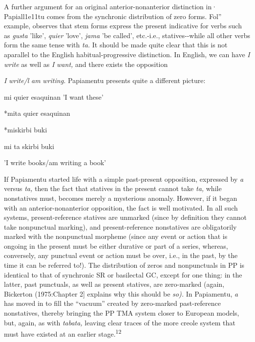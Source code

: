 A further argument for an original anterior-nonanterior distinc\-tion in· Papiall1e11tu comes from the synchronic distribution of zero forms. Fol'' example, \citet[107]{Goilo1953} observes that stem forms express the present indicative for verbs such as \textit{gusta} 'like', \textit{quier} 'love', \textit{jama} 'be called', etc.-i.e., statives-{}-while all other verbs form the same tense with \textit{ta.} It should be made quite clear that this is not aparallel to the English habitual-progressive distinction. In English,
we can have \textit{I} \textit{write} as well as \textit{I} \textit{want,} and there exists the opposition

\textit{I} \textit{write/l} \textit{am} \textit{writing.} Papiamentu presents quite a different picture:

\ea\label{ex:99}
 mi quier esaquinan 'I want these'
\glt
\z

\ea\label{ex:160}
 *mita quier esaquinan
\glt
\z

\ea\label{ex:101}
 *miskirbi buki
\glt
\z

\ea\label{ex:102}
 mi ta skirbi buki
\glt
\z

'I write books/am writing a book'

If Papiamentu started life with a simple past-present opposition,
expressed by \textit{a} versus \textit{ta,} then the fact that statives in the present cannot take \textit{ta,} while nonstatives must, becomes merely a mysterious anomaly. However, if it began with an anterior-nonanterior opposition, the fact is well motivated. In all such systems, present-reference statives are unmarked (since by definition they cannot take nonpunctual mark\-ing), and present-reference nonstatives are obligatorily marked with the nonpunctual morpheme (since any event or action that is ongoing in the present must be either durative or part of a series, whereas, con\-versely, any punctual event or action must be over, i.e., in the past, by the time it can be referred to!). The distribution of zeros and nonpunctuals in PP is identical to that of synchronic SR or basilectal GC, except for one thing: in the latter, past punctuals, as well as present statives, are zero-marked (again, Bickerton (1975:Chapter 2] explains why this should be \textit{so).} In Papiamentu, \textit{a} has moved in to fill the ``vacuum'' created by zero-marked past-reference nonstatives, thereby bringing the PP TMA system closer to European models, but, again, as with \textit{tabata,} leaving clear traces of the more creole system that must have existed at an earlier stage.\textsuperscript{12}

